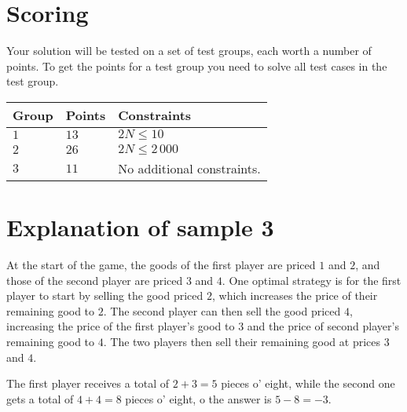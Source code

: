 \section*{Scoring}
Your solution will be tested on a set of test groups, each worth a number of points.
To get the points for a test group you need to solve all test cases in the test group.

\noindent
\begin{tabular}{| l | l | l |}
  \hline
  \textbf{Group} & \textbf{Points} & \textbf{Constraints} \\ \hline
  $1$    & $13$        &  $2N \le 10$ \\ \hline
  $2$    & $26$        &  $2N \le 2\,000$ \\ \hline
  $3$    & $11$        &  No additional constraints. \\ \hline
\end{tabular}

\section*{Explanation of sample 3}
At the start of the game, the goods of the first player are priced $1$ and $2$, and those of the second player are priced $3$ and $4$.
One optimal strategy is for the first player to start by selling the good priced $2$, which increases the price of their remaining good to $2$.
The second player can then sell the good priced $4$, increasing the price of the first player's good to $3$ and the price of second player's remaining good to $4$.
The two players then sell their remaining good at prices $3$ and $4$.

The first player receives a total of $2 + 3 = 5$ pieces o' eight, while the second one gets a total of $4 + 4 = 8$ pieces o' eight, o the answer is $5 - 8 = -3$.
